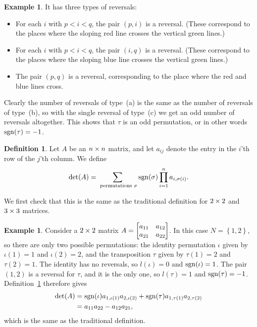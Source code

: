 \documentclass[reqno]{amsart}
\theoremstyle{definition}
\newtheorem{definition}[theorem]{Definition}
\newtheorem{example}[theorem]{Example}
\begin{document}
\begin{example}
 It has three types of reversals:
 \begin{itemize}
  \item[(a)] For each $i$ with $p<i<q$, the pair $(p,i)$ is a
   reversal.  (These correspond to the places where the sloping red
   line crosses the vertical green lines.)
  \item[(b)] For each $i$ with $p<i<q$, the pair $(i,q)$ is a
   reversal.  (These correspond to the places where the sloping blue
   line crosses the vertical green lines.)
  \item[(c)] The pair $(p,q)$ is a reversal, corresponding to the
   place where the red and blue lines cross.
 \end{itemize}
 Clearly the number of reversals of type~(a) is the same as the
 number of reversals of type~(b), so with the single reversal of
 type~(c) we get an odd number of reversals altogether.  This shows
 that $\tau$ is an odd permutation, or in other words
 $\operatorname{sgn}(\tau)=-1$.
\end{example}

\begin{definition}\label{defn-det}
 Let $A$ be an $n\times n$ matrix, and let $a_{ij}$ denote the entry in
 the $i$'th row of the $j$'th column.  We define
 \[ \det(A) =
     \sum_{\text{ permutations } \sigma} \operatorname{sgn}(\sigma) \prod_{i=1}^n
     a_{i,\sigma(i)}.
 \]
\end{definition}

We first check that this is the same as the traditional definition for
$2\times 2$ and $3\times 3$ matrices.

\begin{example}\label{eg-det-two}
 Consider a $2\times 2$ matrix
 $A=\left[\begin{matrix} a_{11}&a_{12}\\ a_{21}&a_{22}\end{matrix}\right]$.  In this case
 $N = \left\{1, 2\right\}$, so there are
 only two possible permutations: the identity permutation $\iota$
 given by $\iota(1)=1$ and $\iota(2)=2$, and the transposition $\tau$
 given by $\tau(1)=2$ and $\tau(2)=1$.  The identity has no reversals,
 so $l(\iota)=0$ and $\operatorname{sgn}(\iota)=1$.  The pair $(1,2)$ is a reversal
 for $\tau$, and it is the only one, so $l(\tau)=1$ and
 $\operatorname{sgn}(\tau)=-1$.  Definition~\ref{defn-det} therefore gives
 \begin{align*}
  \det(A) &= \operatorname{sgn}(\iota)a_{1,\iota(1)}a_{2,\iota(2)} +
             \operatorname{sgn}(\tau) a_{1,\tau(1)}a_{2,\tau(2)} \\
          &= a_{11} a_{22} - a_{12}a_{21},
 \end{align*}
 which is the same as the traditional definition.
\end{example}
\end{document}

